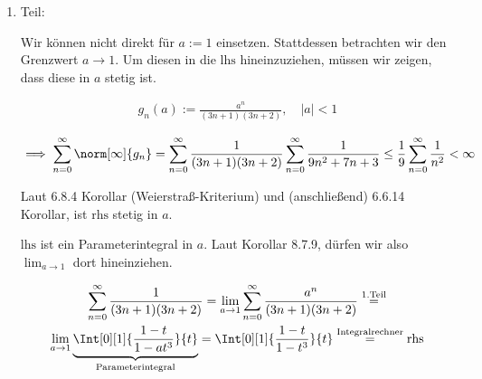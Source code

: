\begin{solution}
\begin{enumerate}[label = \arabic*.]
    \item Teil:
    
    Wir können nicht direkt für $a := 1$ einsetzen.
    Stattdessen betrachten wir den Grenzwert $a \to 1$.
    Um diesen in die $\text{lhs}$ hineinzuziehen, müssen wir zeigen, dass diese in $a$ stetig ist.

    \begin{align*}
        g_n(a)
        :=
        \frac
        {
            a^n
        }{
            (3 n + 1)
            (3 n + 2)
        },
        \quad
        |a| < 1
    \end{align*}

    \begin{align*}
        \implies
        \sum_{n=0}^\infty
        \norm[\infty]{g_n}
        =
        \sum_{n=0}^\infty
        \frac{1}
        {
            (3 n + 1)
            (3 n + 2)
        }
        \sum_{n=0}^\infty
        \frac{1}
        {
            9 n^2 + 7 n + 3
        }
        \leq
        \frac{1}{9}
        \sum_{n=0}^\infty
        \frac{1}{n^2}
        <
        \infty
    \end{align*}


    Laut 6.8.4 Korollar (Weierstraß-Kriterium) und (anschließend) 6.6.14 Korollar, ist $\text{rhs}$ stetig in $a$.


    $\text{lhs}$ ist ein Parameterintegral in $a$.
    Laut Korollar 8.7.9, dürfen wir also $\lim_{a \to 1}$ dort hineinziehen.

    \begin{multline*}
        \sum_{n=0}^\infty
        \frac{1}
        {
            (3 n + 1)
            (3 n + 2)
        }
        =
        \lim_{a \to 1}
        \sum_{n=0}^\infty
        \frac
        {
            a^n
        }{
            (3 n + 1)
            (3 n + 2)
        }
        \stackrel
        {
            \mathrm{1. Teil}
        }{=} \\
        \lim_{a \to 1}
        \underbrace
        {
            \Int[0][1]
            {
                \frac{1 - t}{1 - a t^3}
            }{t}    
        }_\text{
            Parameterintegral
        }
        =
        \Int[0][1]
        {
            \frac{1 - t}{1 - t^3}
        }{t}
        \stackrel
        {
            \mathrm{Integralrechner}
        }{=}
        \mathrm{rhs}
    \end{multline*}

\end{enumerate}

\end{solution}


